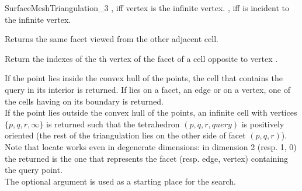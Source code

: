 \begin{ccRefConcept}{SurfaceMeshTriangulation_3}
{, iff vertex  is the infinite vertex.}
\ccGlue
{}
{, iff  is incident to the infinite vertex.
}

{Returns the same facet viewed from the other adjacent cell.}

{Return the indexes of the  th vertex  of the facet of a cell
  opposite to vertex .} %


{
If the point  lies inside the convex hull of the points, the cell 
that contains the query in its interior is returned. If  lies on a
facet, an edge or on a vertex, one of the cells having  on
its boundary is returned.\\ 
If the point  lies outside the convex hull of the points,
an infinite cell with vertices $\{ p, q, r, \infty\}$ is returned such that
the tetrahedron $( p, q, r, query )$ is positively oriented
(the rest of the triangulation lies on the other side of facet 
$( p, q, r )$). \\
Note that locate works even in degenerate dimensions: in dimension 2
(resp. 1, 0) the  returned is the one that represents
the facet (resp. edge, vertex) containing the query point. \\
The optional argument  is used as a starting place for the search.
}


\end{ccRefConcept}
